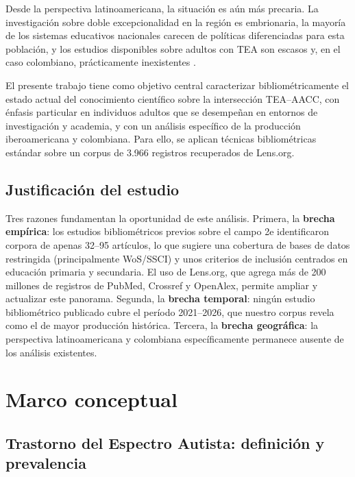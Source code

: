 \documentclass[12pt, a4paper]{article}
\begin{document}
Desde la perspectiva latinoamericana, la situación es aún más precaria. La
investigación sobre doble excepcionalidad en la región es embrionaria, la mayoría
de los sistemas educativos nacionales carecen de políticas diferenciadas para esta
población, y los estudios disponibles sobre adultos con TEA son escasos y, en el
caso colombiano, prácticamente inexistentes \parencite{conejeros2018}.

El presente trabajo tiene como objetivo central caracterizar bibliométricamente el
estado actual del conocimiento científico sobre la intersección TEA--AACC, con
énfasis particular en individuos adultos que se desempeñan en entornos de
investigación y academia, y con un análisis específico de la producción
iberoamericana y colombiana. Para ello, se aplican técnicas bibliométricas
estándar sobre un corpus de 3.966 registros recuperados de Lens.org.

\subsection{Justificación del estudio}

Tres razones fundamentan la oportunidad de este análisis. Primera, la \textbf{brecha
empírica}: los estudios bibliométricos previos sobre el campo 2e \parencite{luor2021,
gelbar2022} identificaron corpora de apenas 32--95 artículos, lo que sugiere una
cobertura de bases de datos restringida (principalmente WoS/SSCI) y unos criterios de
inclusión centrados en educación primaria y secundaria. El uso de Lens.org, que
agrega más de 200 millones de registros de PubMed, Crossref y OpenAlex, permite
ampliar y actualizar este panorama. Segunda, la \textbf{brecha temporal}: ningún
estudio bibliométrico publicado cubre el período 2021--2026, que nuestro corpus
revela como el de mayor producción histórica. Tercera, la \textbf{brecha geográfica}:
la perspectiva latinoamericana y colombiana específicamente permanece ausente de los
análisis existentes.

\section{Marco conceptual}
\label{sec:marco}

\subsection{Trastorno del Espectro Autista: definición y prevalencia}
\end{document}
